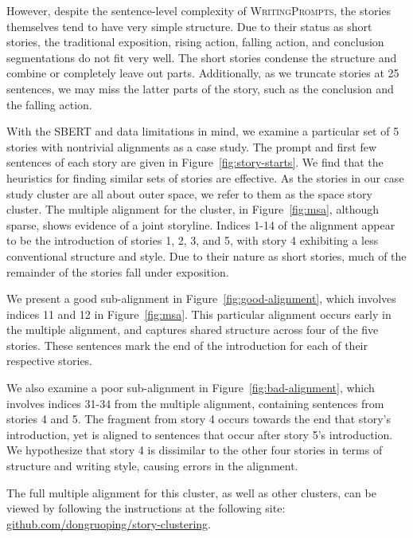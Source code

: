 \documentclass{article}
\begin{document}
However, despite the sentence-level complexity of \textsc{WritingPrompts},
the stories themselves tend to have very simple structure.
Due to their status as short stories, the traditional exposition, rising action,
falling action, and conclusion segmentations do not fit very well.
The short stories condense the structure and combine or completely leave out parts.
Additionally, as we truncate stories at 25 sentences, we may miss the latter
parts of the story, such as the conclusion and the falling action.

With the SBERT and data limitations in mind, we examine a particular set of 5 stories 
with nontrivial alignments as a case study.
The prompt and first few sentences of each story are given in Figure~\ref{fig:story-starts}.
We find that the heuristics for finding similar sets of stories are effective.
As the stories in our case study cluster are all about outer space, we refer to them as
the space story cluster.
The multiple alignment for the cluster, in Figure~\ref{fig:msa},
although sparse, shows evidence of a joint storyline.
Indices 1-14 of the alignment appear to be the introduction of stories 1, 2, 3, and 5,
with story 4 exhibiting a less conventional structure and style.
Due to their nature as short stories, much of the remainder of the stories fall under exposition.

We present a good sub-alignment in Figure~\ref{fig:good-alignment},
which involves indices 11 and 12 in Figure~\ref{fig:msa}.
This particular alignment occurs early in the multiple alignment,
and captures shared structure across four of the five stories.
These sentences mark the end of the introduction for each of their respective stories.

We also examine a poor sub-alignment in Figure~\ref{fig:bad-alignment},
which involves indices 31-34 from the multiple alignment,
containing sentences from stories 4 and 5.
The fragment from story 4 occurs towards the end that story's introduction,
yet is aligned to sentences that occur after story 5's introduction.
We hypothesize that story 4 is dissimilar to the other four stories
in terms of structure and writing style, causing errors in the alignment.

The full multiple alignment for this cluster, as well as other clusters,
can be viewed by following the instructions at the following site:
\href{https://github.com/dongruoping/story-clustering/}{github.com/dongruoping/story-clustering}.
\end{document}

